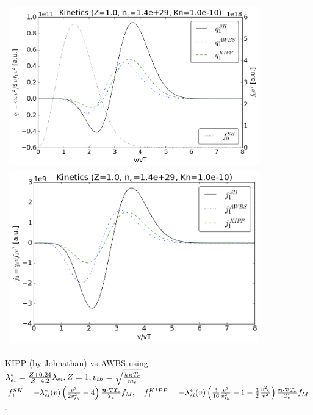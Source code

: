 \begin{figure}[tbh]
  \begin{center}
    \begin{tabular}{c}
      \includegraphics[width=1.0\textwidth]{../VFPdata/KIPP_q_kinetics.png} \\
      \includegraphics[width=1.0\textwidth]{../VFPdata/KIPP_j_kinetics.png}
    \end{tabular}
  \caption{KIPP (by Johnathan) vs AWBS using 
  $\lambda_{ei}^* = \frac{Z + 0.24}{Z + 4.2}\lambda_{ei}, Z=1, 
  v_{th} = \sqrt{\frac{k_B T_e}{m_e}}$ 
  $f_1^{SH} = -\lambda_{ei}^*(v) \left(\frac{v^2}{2 v_{th}^2} - 4\right) 
  \frac{\boldsymbol{n}\cdot\nabla T_e}{T_e} f_M,\quad 
  f_1^{KIPP} = -\lambda_{ei}^*(v) \left(\frac{3}{16}\frac{v^2}{v_{th}^2} - 1 
  - \frac{3}{2}\frac{v_{th}^2}{v^2} \right) 
  \frac{\boldsymbol{n}\cdot\nabla T_e}{T_e} f_M$.
  }
  \end{center}
  \label{fig:}
\end{figure}

